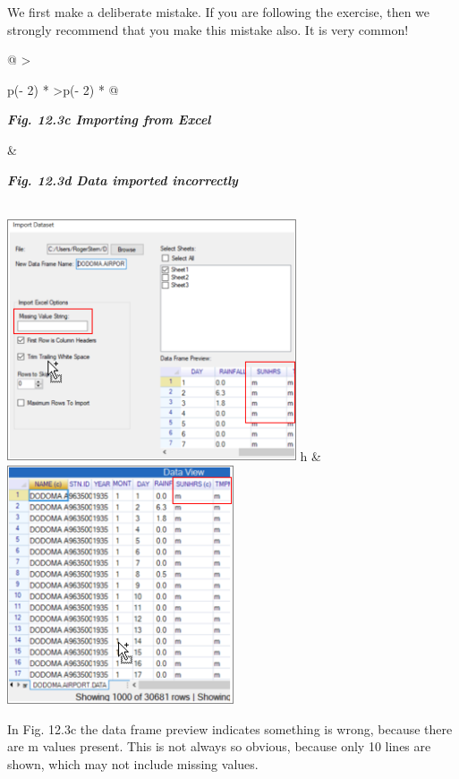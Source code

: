 \documentclass[
  letterpaper,
  DIV=11,
  numbers=noendperiod]{scrreprt}
\begin{document}
We first make a deliberate mistake. If you are following the exercise,
then we strongly recommend that you make this mistake also. It is very
common!

\begin{longtable}[]{@{}
  >{\raggedright\arraybackslash}p{(\columnwidth - 2\tabcolsep) * }
  >{\raggedleft\arraybackslash}p{(\columnwidth - 2\tabcolsep) * }@{}}
\toprule\noalign{}
\begin{minipage}[b]{\linewidth}\raggedright
\textbf{\emph{Fig. 12.3c Importing from Excel}}
\end{minipage} & \begin{minipage}[b]{\linewidth}\raggedleft
\textbf{\emph{Fig. 12.3d Data imported incorrectly}}
\end{minipage} \\
\midrule\noalign{}
\endhead
\bottomrule\noalign{}
\endlastfoot
\includegraphics[width=3.36393in,height=2.81471in]{figures/Fig12.3c.png}
h &
\includegraphics[width=2.63599in,height=\textheight]{figures/Fig12.3d.png} \\
\end{longtable}

In Fig. 12.3c the data frame preview indicates something is wrong,
because there are m values present. This is not always so obvious,
because only 10 lines are shown, which may not include missing values.
\end{document}
